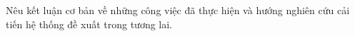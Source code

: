 Nêu kết luận cơ bản về những công việc đã thực hiện và hướng nghiên cứu cải tiến hệ thống đề xuất trong tương lai.
